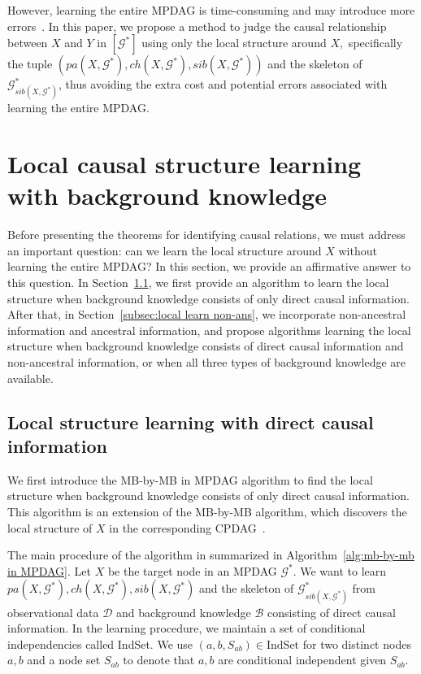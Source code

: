\documentclass{article}
\begin{document}
However, learning the entire MPDAG is time-consuming and may introduce more errors~\citep{chickering1996learning, chickering2004large}.
In this paper, we propose a method to judge the causal relationship between $X$ and $Y$ in $\left[\mathcal{G}^*\right]$ using only the local structure around $X,$ specifically the tuple $\left(pa(X,\mathcal{G}^*),ch(X,\mathcal{G}^*),sib(X,\mathcal{G}^*)\right)$ and the skeleton of $\mathcal{G}^*_{sib(X,\mathcal{G}^*)}$, thus avoiding the extra cost and potential errors associated with learning the entire MPDAG.

\section{Local causal structure learning with background knowledge}
\label{sec:mb by mb in mpdag}
Before presenting the theorems for identifying causal relations, we must address an important question: can we learn the local structure around $X$ without learning the entire MPDAG? In this section, we provide an affirmative answer to this question. In Section~\ref{subsec:local learning direct cause}, we first provide an algorithm to learn the local structure when background knowledge consists of only direct causal information. After that, in Section~\ref{subsec:local learn non-ans}, we incorporate non-ancestral information and ancestral information, and propose algorithms learning the local structure when background knowledge consists of direct causal information and non-ancestral information, or when all three types of background knowledge are available.

\subsection{Local structure learning with direct causal information}
\label{subsec:local learning direct cause}

We first introduce the MB-by-MB in MPDAG algorithm to find the local structure when background knowledge consists of only direct causal information. This algorithm is an extension of the MB-by-MB algorithm, which discovers the local structure of $X$ in the corresponding CPDAG~\citep{wang2014discovering, liu2020local, xie2024local}.

The main procedure of the algorithm in summarized in Algorithm~\ref{alg:mb-by-mb in MPDAG}.
Let $X$ be the target node in an MPDAG $\mathcal{G}^*.$
We want to learn $pa(X,\mathcal{G}^*),ch(X,\mathcal{G}^*),sib(X,\mathcal{G}^*)$ and the skeleton of $\mathcal{G}^*_{sib(X,\mathcal{G}^*)}$ from observational data $\mathcal{D}$ and background knowledge $\mathcal{B}$ consisting of direct causal information.
In the learning procedure, we maintain a set of conditional independencies called IndSet.
We use $(a,b,S_{ab})\in \mathrm{IndSet}$ for two distinct nodes $a,b$ and a node set $S_{ab}$ to denote that $a,b$ are conditional independent given $S_{ab}.$
\end{document}
